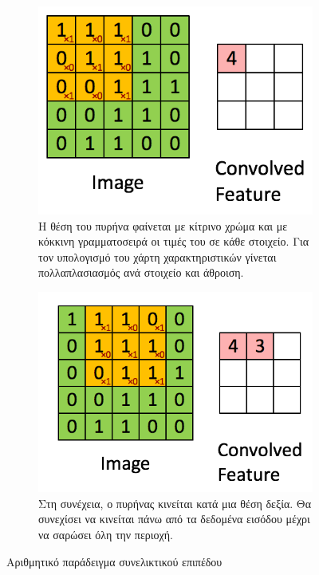 \begin{figure}[h]
	\centering
	\begin{subfigure}[h]{0.45\textwidth}
		\centering
		\includegraphics[width=\textwidth]{images/appendix/convolution_1.png}
		\caption{Η θέση του πυρήνα φαίνεται με κίτρινο χρώμα και με κόκκινη γραμματοσειρά οι τιμές του σε κάθε στοιχείο. Για τον υπολογισμό του χάρτη χαρακτηριστικών γίνεται πολλαπλασιασμός ανά στοιχείο και άθροιση.}
	\end{subfigure}
	\hfill
	\begin{subfigure}[h]{0.45\textwidth}
		\centering
		\includegraphics[width=\textwidth]{images/appendix/convolution_2.png}
		\caption{Στη συνέχεια, ο πυρήνας κινείται κατά μια θέση δεξία. Θα συνεχίσει να κινείται πάνω από τα δεδομένα εισόδου μέχρι να σαρώσει όλη την περιοχή.}
	\end{subfigure}
	\caption{Αριθμητικό παράδειγμα συνελικτικού επιπέδου}
	\label{fig:convolution_example}
\end{figure}

